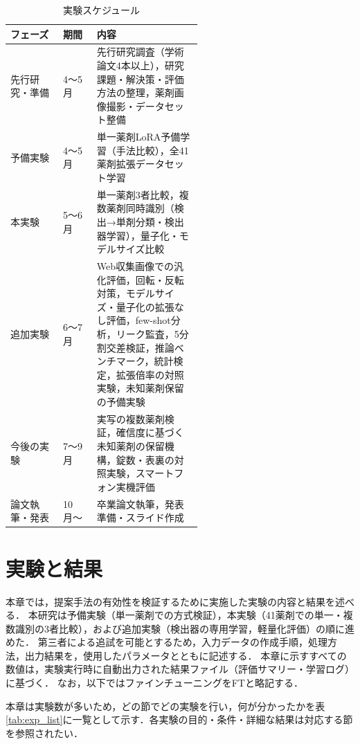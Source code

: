 \documentclass[dvipdfmx]{jsarticle}
\begin{document}
\begin{table}[h]
\centering
\caption{実験スケジュール}
\label{tab:schedule}
\begin{tabular}{llp{0.55\linewidth}}
\hline
フェーズ & 期間 & 内容 \\
\hline
先行研究・準備 & 4〜5月 & 先行研究調査（学術論文4本以上），研究課題・解決策・評価方法の整理，薬剤画像撮影・データセット整備 \\
予備実験       & 4〜5月 & 単一薬剤LoRA予備学習（手法比較），全41薬剤拡張データセット学習 \\
本実験         & 5〜6月 & 単一薬剤3者比較，複数薬剤同時識別（検出→単剤分類・検出器学習），量子化・モデルサイズ比較 \\
追加実験       & 6〜7月 & Web収集画像での汎化評価，回転・反転対策，モデルサイズ・量子化の拡張なし評価，few-shot分析，リーク監査，5分割交差検証，推論ベンチマーク，統計検定，拡張倍率の対照実験，未知薬剤保留の予備実験 \\
今後の実験     & 7〜9月 & 実写の複数薬剤検証，確信度に基づく未知薬剤の保留機構，錠数・表裏の対照実験，スマートフォン実機評価 \\
論文執筆・発表 & 10月〜 & 卒業論文執筆，発表準備・スライド作成 \\
\hline
\end{tabular}
\end{table}

\newpage

\section{実験と結果}\label{sec4}

本章では，提案手法の有効性を検証するために実施した実験の内容と結果を述べる．
本研究は予備実験（単一薬剤での方式検証），本実験（41薬剤での単一・複数識別の3者比較），および追加実験（検出器の専用学習，軽量化評価）の順に進めた．
第三者による追試を可能とするため，入力データの作成手順，処理方法，出力結果を，使用したパラメータとともに記述する．
本章に示すすべての数値は，実験実行時に自動出力された結果ファイル（評価サマリー・学習ログ）に基づく．
なお，以下ではファインチューニングをFTと略記する．

本章は実験数が多いため，どの節でどの実験を行い，何が分かったかを表\ref{tab:exp_list}に一覧として示す．各実験の目的・条件・詳細な結果は対応する節を参照されたい．
\end{document}

